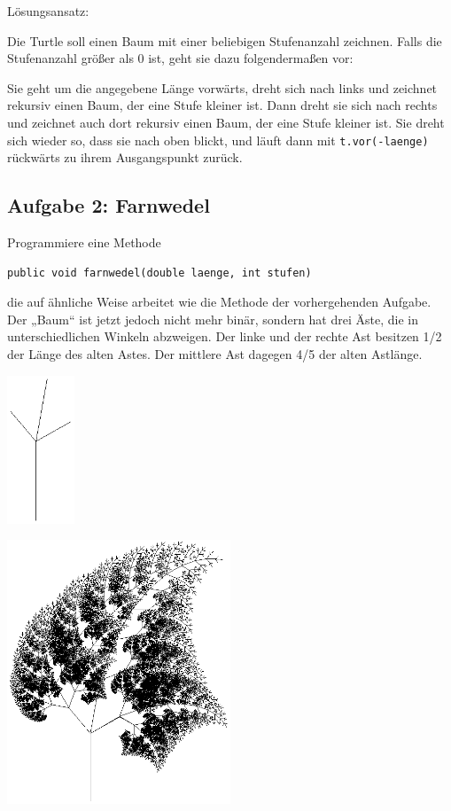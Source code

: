 Lösungsansatz:

Die Turtle soll einen Baum mit einer beliebigen Stufenanzahl zeichnen. Falls
die Stufenanzahl größer als 0 ist, geht sie dazu folgendermaßen vor:

Sie geht um die angegebene Länge vorwärts, dreht sich nach links und zeichnet
rekursiv einen Baum, der eine Stufe kleiner ist. Dann dreht sie sich nach
rechts und zeichnet auch dort rekursiv einen Baum, der eine Stufe kleiner ist.
Sie dreht sich wieder so, dass sie nach oben blickt, und läuft dann mit
\lstinline|t.vor(-laenge)| rückwärts zu ihrem Ausgangspunkt zurück.


\subsection{Aufgabe 2: Farnwedel}

Programmiere eine Methode

\begin{lstlisting}
public void farnwedel(double laenge, int stufen)
\end{lstlisting}

die auf ähnliche Weise arbeitet wie die Methode der vorhergehenden Aufgabe. Der
„Baum“ ist jetzt jedoch nicht mehr binär, sondern hat drei Äste, die in
unterschiedlichen Winkeln abzweigen. Der linke und der rechte Ast besitzen 1/2
der Länge des alten Astes. Der mittlere Ast dagegen 4/5 der alten Astlänge.

\begin{minipage}[b]{0.4\textwidth}
  \centering
   \includegraphics[width=0.15\textwidth]{./inf/SEKII/06_Java_Rekursion/Aufgabe2_2-2.png}
\end{minipage}\hfill                  
\begin{minipage}[b]{0.6\textwidth}
  \centering
   \includegraphics[width=0.5\textwidth]{./inf/SEKII/06_Java_Rekursion/Aufgabe2_2-11.png}
\end{minipage}


